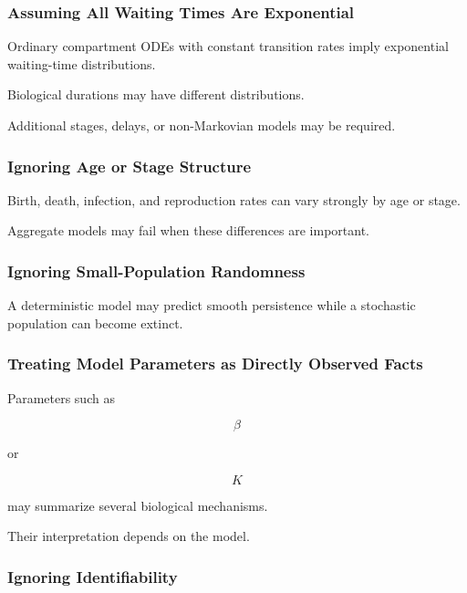 \subsubsection{Assuming All Waiting Times Are Exponential}

Ordinary compartment ODEs with constant transition rates imply exponential
waiting-time distributions.

Biological durations may have different distributions.

Additional stages, delays, or non-Markovian models may be required.

\subsubsection{Ignoring Age or Stage Structure}

Birth, death, infection, and reproduction rates can vary strongly by age or
stage.

Aggregate models may fail when these differences are important.

\subsubsection{Ignoring Small-Population Randomness}

A deterministic model may predict smooth persistence while a stochastic
population can become extinct.

\subsubsection{Treating Model Parameters as Directly Observed Facts}

Parameters such as

\[
\beta
\]

or

\[
K
\]

may summarize several biological mechanisms.

Their interpretation depends on the model.

\subsubsection{Ignoring Identifiability}

